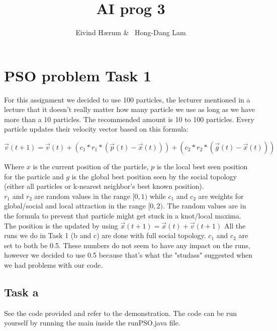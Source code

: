 \documentclass[12pt, a4paper]{article}
\title{AI prog 3}
\author{Eivind Hærum \& \ Hong-Dang Lam}
\begin{document}
\maketitle
% 
% 
 
\newpage
\tableofcontents
\newpage
 
\section{PSO problem Task 1}
For this assignment we decided to use 100 particles, the lecturer mentioned in a lecture that it doesn't really matter how many particle we use as long as we have more than a 10 particles. The recommended amount is 10 to 100 particles.
Every particle updates their velocity vector based on this formula:
\begin{center}
$\vec{v}(t+1)=\vec{v}(t)+(c_1*r_1*(\vec{p}(t)-\vec{x}(t))) +(c_2*r_2*(\vec{g}(t)-\vec{x}(t)))$
\end{center}
Where $x$ is the current position of the particle, $p$ is the local best seen position for the particle and $g$ is the global best position seen by the social topology (either all particles or k-nearest neighbor's best known position).\\
$r_1$ and $r_2$ are random values in the range $[0,1)$ while $c_1$ and $c_2$ are weights for global/social and local attraction in the range $[0,2)$. The random values are in the formula to prevent that particle might get stuck in a knot/local maxima.\\
The position is the updated by using $\vec{x}(t+1)=\vec{x}(t)+\vec{v}(t+1)$
All the runs we do in Task 1 (b and c) are done with full social topology.
$c_1$ and $c_2$ are set to both be 0.5. These numbers do not seem to have any impact on the runs, however we decided to use 0.5 because that's what the "studass" suggested when we had problems with our code.

\subsection{Task a}
See the code provided and refer to the demonstration.
The code can be run yourself by running the main inside the runPSO.java file.
\end{document}
